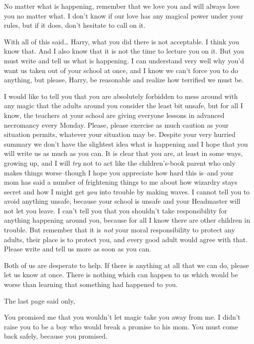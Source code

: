 \begin{writtenNote}
No matter what is happening, remember that we love you and will always love you no matter what. I don't know if our love has any magical power under your rules, but if it does, don't hesitate to call on it.

With all of this said{\ldots} Harry, what you did there is not acceptable. I think you know that. And I also know that it is not the time to lecture you on it. But you must write and tell us what is happening. I can understand very well why you'd want us taken out of your school at once, and I know we can't force you to do anything, but please, Harry, be reasonable and realize how terrified we must be.

I would like to tell you that you are absolutely forbidden to mess around with any magic that the adults around you consider the least bit unsafe, but for all I know, the teachers at your school are giving everyone lessons in advanced necromancy every Monday. Please, please exercise as much caution as your situation permits, whatever your situation may be. Despite your very hurried summary we don't have the slightest idea what is happening and I hope that you will write us as much as you can. It is clear that you are, at least in some ways, growing up, and I will \emph{try} not to act like the children's-book parent who only makes things worse\---though I hope you appreciate how hard this is\---and your mom has said a number of frightening things to me about how wizardry stays secret and how I might get \emph{you} into trouble by making waves. I cannot tell you to avoid anything unsafe, because your school is unsafe and your Headmaster will not let you leave. I can't tell you that you shouldn't take responsibility for anything happening around you, because for all I know there are other children in trouble. But remember that it is \emph{not} your moral responsibility to protect any adults, their place is to protect you, and every good adult would agree with that. Please write and tell us more as soon as you can.

Both of us are desperate to help. If there is anything at all that we can do, please let us know at once. There is nothing which can happen to us which would be worse than learning that something had happened to you.

\end{writtenNote}

The last page said only,

\begin{writtenNote}
You promised me that you wouldn't let magic take you away from me. I didn't raise you to be a boy who would break a promise to his mom. You must come back safely, because you promised.

\end{writtenNote}

